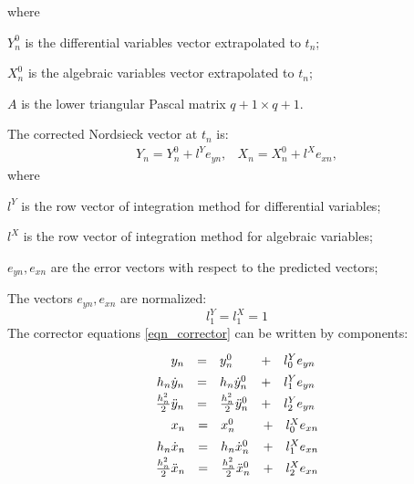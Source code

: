 \documentclass[lettersize,journal]{IEEEtran}
\begin{document}
\noindent where 
\begin{description}
	\item  \(Y_n^0\) is the differential variables vector extrapolated to \(t_n\);
	\item  \(X_n^0\) is the algebraic variables vector extrapolated to \(t_n\);
	\item  \(A\) is the lower triangular Pascal matrix \(q+1 \times q+1\).
\end{description}

The corrected Nordsieck vector at \(t_n\) is: 
\begin{equation}
	\label{eqn_corrector}
	\begin{array}{cc}
		Y_n=Y_n^0 +l^Ye_{yn}, &
		X_n=X_n^0 +l^Xe_{xn},
	\end{array}
\end{equation}
\noindent where 
\begin{description}
	\item  \(l^Y\) is the row vector of integration method for differential variables;
	\item  \(l^X\) is the row vector of integration method for algebraic variables;
	\item  \(e_{yn}, e_{xn}\) are the error vectors with respect to the predicted vectors;
\end{description}
The vectors \(e_{yn}, e_{xn}\) are normalized:
\begin{equation}
	\label{eqn_nordnormal}
		l^Y_1=l^X_1=1
\end{equation}
The corrector equations \eqref{eqn_corrector} can be written by components:
\begin{equation}
	\label{eqn_corrcomp}
	\def\arraystretch{1.4}
	\begin{array}{l}
		\begin{array}{rllll}
			y_n &= &y_n^0&+&l_0^Ye_{yn} \\
			h_n \dot{y}_n &=& h_n \dot{y}_n^0&+&l_1^Ye_{yn} \\
			\frac{h_n^2}{2}\ddot{y}_n &=& \frac{h_n^2}{2}\ddot{y}_n^0& + &l_2^Ye_{yn}
		\end{array}
		\\
		\begin{array}{rllll}
			x_n &= &x_n^0&+&l_0^Xe_{xn} \\
			h_n \dot{x}_n &=& h_n \dot{x}_n^0&+&l_1^Xe_{xn} \\
			\frac{h_n^2}{2}\ddot{x}_n &=& \frac{h_n^2}{2}\ddot{x}_n^0& + &l_2^Xe_{xn}
		\end{array}
	\end{array}
\end{equation}
\end{document}
